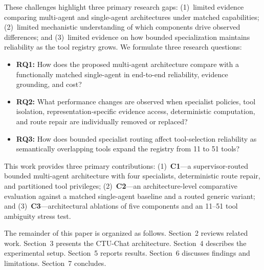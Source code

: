 These challenges highlight three primary research gaps: (1)~limited evidence comparing multi-agent and single-agent architectures under matched capabilities; (2)~limited mechanistic understanding of which components drive observed differences; and (3)~limited evidence on how bounded specialization maintains reliability as the tool registry grows. We formulate three research questions:
\begin{itemize}
    \setlength{\itemsep}{1.5pt}
    \setlength{\parsep}{0pt}
    \setlength{\parskip}{0pt}
    \item \textbf{RQ1:} How does the proposed multi-agent architecture compare with a functionally matched single-agent in end-to-end reliability, evidence grounding, and cost?
    \item \textbf{RQ2:} What performance changes are observed when specialist policies, tool isolation, representation-specific evidence access, deterministic computation, and route repair are individually removed or replaced?
    \item \textbf{RQ3:} How does bounded specialist routing affect tool-selection reliability as semantically overlapping tools expand the registry from 11 to 51 tools?
\end{itemize}

This work provides three primary contributions:
(1)~\textbf{C1}---a supervisor-\allowbreak routed bounded multi-agent architecture with four specialists, deterministic route repair, and partitioned tool privileges;
(2)~\textbf{C2}---an architecture-level comparative evaluation against a matched single-agent baseline and a routed generic variant; and
(3)~\textbf{C3}---architectural ablations of five components and an 11--51 tool ambiguity stress test.

The remainder of this paper is organized as follows. Section~2 reviews related work. Section~3 presents the CTU-Chat architecture. Section~4 describes the experimental setup. Section~5 reports results. Section~6 discusses findings and limitations. Section~7 concludes.
